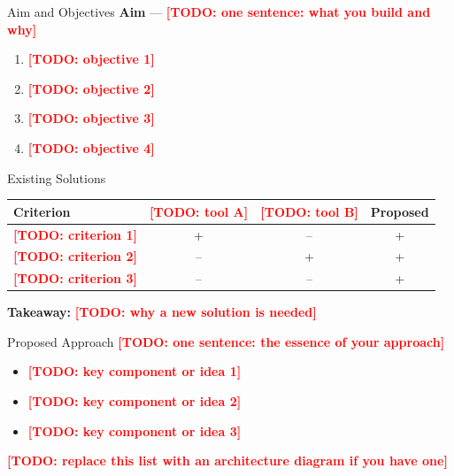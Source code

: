 \documentclass[aspectratio=169, 14pt]{beamer}
\newcommand{\todo}[1]{\textcolor{red}{\textbf{[TODO: #1]}}}
\begin{document}
\begin{frame}{Aim and Objectives}
  {\color{hseblue}\textbf{Aim}} --- \todo{one sentence: what you build and why}

  \vspace{0.4em}
  \begin{enumerate}
    \item \todo{objective 1}
    \item \todo{objective 2}
    \item \todo{objective 3}
    \item \todo{objective 4}
  \end{enumerate}
\end{frame}

\begin{frame}{Existing Solutions}
  \begin{center}
    \small
    \begin{tabular}{lccc}
      \toprule
      \textbf{Criterion} & \todo{tool A} & \todo{tool B} & \textbf{Proposed} \\
      \midrule
      \todo{criterion 1} & + & -- & + \\
      \todo{criterion 2} & -- & + & + \\
      \todo{criterion 3} & -- & -- & + \\
      \bottomrule
    \end{tabular}
  \end{center}

  \vspace{0.4em}
  {\color{hseblue}\textbf{Takeaway:}} \todo{why a new solution is needed}
\end{frame}

\begin{frame}{Proposed Approach}
  \todo{one sentence: the essence of your approach}

  \vspace{0.4em}
  \begin{itemize}
    \item \todo{key component or idea 1}
    \item \todo{key component or idea 2}
    \item \todo{key component or idea 3}
  \end{itemize}

  \vspace{0.4em}
  \todo{replace this list with an architecture diagram if you have one}
\end{frame}
\end{document}

